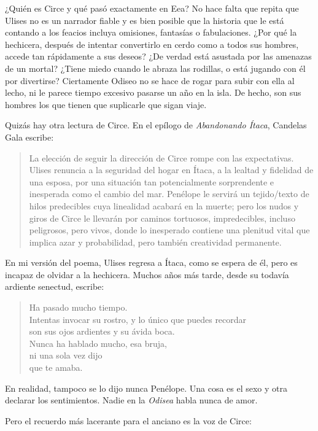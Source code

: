 ¿Quién es Circe y qué pasó exactamente en Eea? No hace falta que repita que Ulises no es un narrador fiable y es bien posible que la historia que le está contando a los feacios incluya omisiones, fantasías o fabulaciones. ¿Por qué la hechicera, después de intentar convertirlo en cerdo como a todos sus hombres, accede tan rápidamente a sus deseos? ¿De verdad está asustada por las amenazas de un mortal? ¿Tiene miedo cuando le abraza las rodillas, o está jugando con él por divertirse? Ciertamente Odiseo no se hace de rogar para subir con ella al lecho, ni le parece tiempo excesivo pasarse un año en la isla. De hecho, son sus hombres los que tienen que suplicarle que sigan viaje.

Quizás hay otra lectura de Circe. En el epílogo de \emph{Abandonando Ítaca}, Candelas Gala escribe:

\begin{quotation}
La elección de seguir la dirección de Circe rompe con las expectativas. Ulises renuncia a la seguridad del hogar en Ítaca, a la lealtad y fidelidad de una esposa, por una situación tan potencialmente sorprendente e inesperada como el cambio del mar. Penélope le servirá un tejido/texto de hilos predecibles cuya linealidad acabará en la muerte; pero los nudos y giros de Circe le llevarán por caminos tortuosos, impredecibles, incluso peligrosos, pero vivos, donde lo inesperado contiene una plenitud vital que implica azar y probabilidad, pero también creatividad permanente.
\end{quotation}

En mi versión del poema, Ulises regresa a Ítaca, como se espera de él, pero es incapaz de olvidar a la hechicera. Muchos años más tarde, desde su todavía ardiente senectud, escribe:

\begin{verse}
Ha pasado mucho tiempo.\\
Intentas invocar su rostro, y lo único que puedes recordar\\
son sus ojos ardientes y su ávida boca.\\
Nunca ha hablado mucho, esa bruja,\\
ni una sola vez dijo\\
que te amaba.
\end{verse}

En realidad, tampoco se lo dijo nunca Penélope. Una cosa es el sexo y otra declarar los sentimientos. Nadie en la \emph{Odisea} habla nunca de amor.

Pero el recuerdo más lacerante para el anciano es la voz de Circe:

